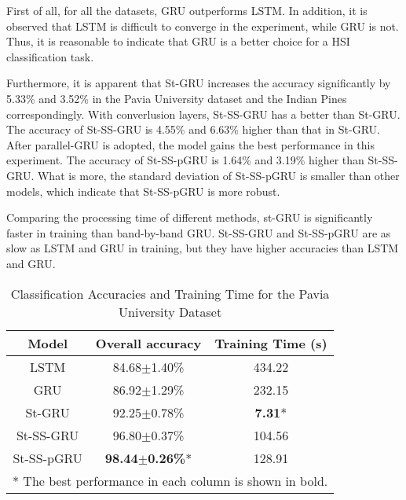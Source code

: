 \documentclass[conference]{IEEEtran}
\begin{document}
First of all, for all the datasets, GRU outperforms LSTM. In addition, it is observed
that LSTM is difficult to converge in the experiment, while GRU is not. Thus, it is
reasonable to indicate that GRU is a better choice for a HSI classification task.

Furthermore, it is apparent that St-GRU increases the accuracy significantly by 5.33\%
and 3.52\% in the Pavia University dataset and the Indian Pines correspondingly. With
converlusion layers, St-SS-GRU has a better than St-GRU. The accuracy of St-SS-GRU is
4.55\% and 6.63\% higher than that in St-GRU. After parallel-GRU is adopted, the model
gains the best performance in this experiment. The accuracy of St-SS-pGRU is 1.64\%
and 3.19\% higher than St-SS-GRU. What is more, the standard deviation of St-SS-pGRU
is smaller than other models, which indicate that St-SS-pGRU is more robust. 

Comparing the processing time of different methods, st-GRU is significantly faster
in training than band-by-band GRU. St-SS-GRU and St-SS-pGRU are as slow as LSTM and
GRU in training, but they have higher accuracies than LSTM and GRU.



\begin{table}[htbp]
    \caption{Classification Accuracies and Training Time for the Pavia University Dataset}
    \begin{center}
    \begin{tabular}{c|cc}
    \hline
    \hline
    \textbf{Model} & \textbf{Overall accuracy} & \textbf{Training Time (s)} \\
    \hline
    LSTM           & 84.68$\pm$1.40\%               & 434.22                    \\
    GRU            & 86.92$\pm$1.29\%               & 232.15                    \\
    St-GRU         & 92.25$\pm$0.78\%               & \textbf{7.31}*            \\
    St-SS-GRU      & 96.80$\pm$0.37\%               & 104.56                     \\
    St-SS-pGRU     & \textbf{98.44$\pm$0.26\%}*     & 128.91                     \\
    \hline
    \hline
    \multicolumn{3}{l}{* The best performance in each column is shown in bold.}\\
    \end{tabular}
    \end{center}
    \label{tab:puaac}
    \end{table}
    
\end{document}
